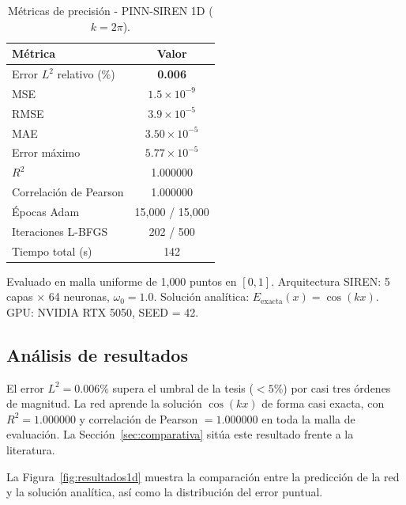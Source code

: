 \begin{table}[htbp]
\centering
\begin{threeparttable}
\caption{Métricas de precisión - PINN-SIREN 1D ($k = 2\pi$).}
\label{tab:resultados1d}
\begin{tabular}{lc}
\toprule
Métrica & Valor \\
\midrule
Error $L^2$ relativo (\%)    & \textbf{0.006} \\
MSE                          & $1.5 \times 10^{-9}$ \\
RMSE                         & $3.9 \times 10^{-5}$ \\
MAE                          & $3.50 \times 10^{-5}$ \\
Error máximo                 & $5.77 \times 10^{-5}$ \\
$R^2$                        & 1.000000 \\
Correlación de Pearson       & 1.000000 \\
\midrule
Épocas Adam                  & 15{,}000 / 15{,}000 \\
Iteraciones L-BFGS           & 202 / 500 \\
Tiempo total (s)             & 142 \\
\bottomrule
\end{tabular}
\begin{tablenotes}\small
    \item Evaluado en malla uniforme de 1{,}000 puntos en $[0,1]$.
    Arquitectura SIREN: 5 capas $\times$ 64 neuronas, $\omega_0 = 1.0$.
    Solución analítica: $E_\text{exacta}(x) = \cos(kx)$.
    GPU: NVIDIA RTX 5050, SEED = 42.
\end{tablenotes}
\end{threeparttable}
\end{table}

\subsection{Análisis de resultados}

El error $L^2 = 0.006\%$ supera el umbral de la tesis ($< 5\%$) por casi tres
órdenes de magnitud. La red aprende la solución $\cos(kx)$ de forma casi
exacta, con $R^2 = 1.000000$ y correlación de Pearson $= 1.000000$ en toda la
malla de evaluación. La Sección~\ref{sec:comparativa} sitúa este resultado
frente a la literatura.

La Figura~\ref{fig:resultados1d} muestra la comparación entre la predicción de
la red y la solución analítica, así como la distribución del error puntual.

